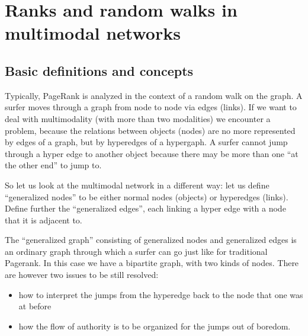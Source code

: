 \documentclass{fundam}
\begin{document}
\section{Ranks and random walks in multimodal networks}\label{sec-multimodalnets}

\subsection{Basic definitions and concepts}

Typically, PageRank is analyzed in the context of a random walk on the graph. A surfer moves through a graph from node to node via edges (links). If we want to deal with multimodality (with more than two modalities)  we encounter a problem, because the relations between objects (nodes) are no more represented by edges of a graph, but by hyperedges of a hypergaph.
A surfer cannot jump through a hyper edge to another object because there may be more than one ``at the other end'' to jump to.

So let us look at the multimodal network in a different way: let us define  ``generalized nodes'' to be either normal nodes (objects) or hyperedges (links). Define further the ``generalized edges'', each  linking a hyper edge with a node  that it is adjacent to.

\medskip
The ``generalized graph'' consisting of generalized nodes and generalized edges is an ordinary graph through which a surfer can go just like for traditional Pagerank. In this case we have a bipartite graph, with two kinds of nodes. There are however two issues to be still resolved:
\begin{itemize}
\item how to interpret  the jumps from the hyperedge back to the node that one was at before
\item how the flow of authority is to be organized for the jumps out of boredom.
\end{itemize}
\end{document}
